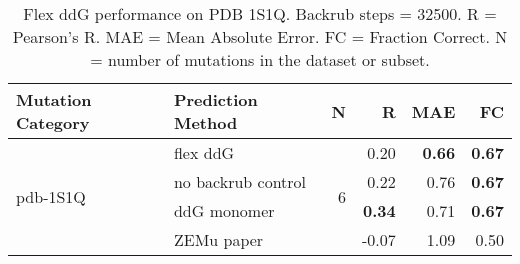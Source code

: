 \begin{table}
  \begin{tabular}{llrrrr}
\toprule
Mutation Category &   Prediction Method &  N &     R &  MAE &   FC \\
\midrule
 \multirow{ 4}{*}{pdb-1S1Q} & flex ddG & \multirow{ 4}{*}{6} & 0.20 & \textbf{0.66} & \textbf{0.67}  \\
 & no backrub control & & 0.22 & 0.76 & \textbf{0.67}  \\
 & ddG monomer & & \textbf{0.34} & 0.71 & \textbf{0.67}  \\
 & ZEMu paper & & -0.07 & 1.09 & 0.50  \\
\bottomrule
\end{tabular}
  \caption[Flex ddG performance on PDB 1S1Q]{
    Flex ddG performance on PDB 1S1Q. Backrub steps = 32500. R = Pearson's R. MAE = Mean Absolute Error. FC = Fraction Correct. N = number of mutations in the dataset or subset.
  } \label{tab:table-pdb-1S1Q}
\end{table}

